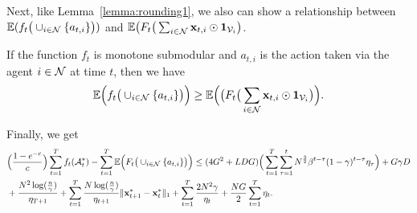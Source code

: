 Next, like Lemma~\ref{lemma:rounding1}, we also can show a relationship between $\mathbb{E}(f_{t}\big(\cup_{i\in\mathcal{N}}\{a_{t,i}\}\big))$ and $\mathbb{E}\big(F_{t}\big(\sum_{i\in\mathcal{N}}\mathbf{x}_{t,i}\odot\mathbf{1}_{\mathcal{V}_{i}}\big)$.
\begin{lemma}
	If the function $f_{t}$ is monotone submodular and $a_{t,i}$ is the action taken via the agent $i\in\mathcal{N}$ at time $t$, then we have 
	\begin{equation*}
		\mathbb{E}\Big(f_{t}\big(\cup_{i\in\mathcal{N}}\{a_{t,i}\}\big)\Big)\ge\mathbb{E}\Big(\big(F_{t}\big(\sum_{i\in\mathcal{N}}\mathbf{x}_{t,i}\odot\mathbf{1}_{\mathcal{V}_{i}}\big)\Big).  
	\end{equation*}
\end{lemma}
Finally,  we get
\begin{equation*}
	\begin{aligned}
		&\Big(\frac{1-e^{-c}}{c}\Big)\sum_{t=1}^{T}f_{t}(\mathcal{A}^{*}_{t})-\sum_{t=1}^{T}\mathbb{E}\Big(F_{t}\big(\cup_{i\in\mathcal{N}}\{a_{t,i}\}\big)\Big)\le(4G^{2}+LDG)\Big(\sum_{t=1}^{T}\sum_{\tau=1}^{t}N^{\frac{3}{2}}\beta^{t-\tau}(1-\gamma)^{t-\tau}\eta_{\tau}\Big)+G\gamma D\\&+\frac{N^{2}\log(\frac{n}{\gamma})}{\eta_{T+1}}+\sum_{t=1}^{T}\frac{N\log(\frac{n}{\gamma})}{\eta_{t+1}}\|\mathbf{x}_{t+1}^{*}-\mathbf{x}_{t}^{*}\|_{1}+\sum_{t=1}^{T}\frac{2N^{2}\gamma}{\eta_{t}}+\frac{NG}{2}\sum_{t=1}^{T}\eta_{t}.
	\end{aligned}
\end{equation*}
